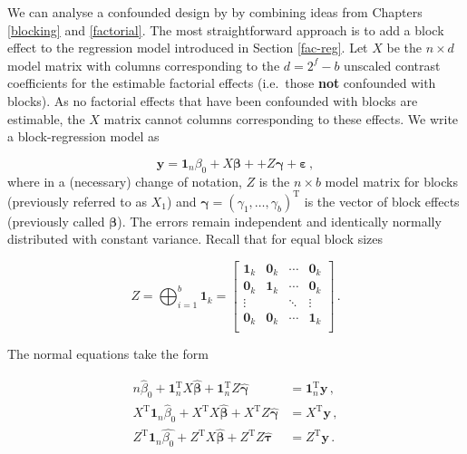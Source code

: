 \documentclass[
]{book}
\theoremstyle{definition}
\theoremstyle{definition}
\theoremstyle{definition}
\theoremstyle{definition}
\theoremstyle{remark}
\begin{document}
We can analyse a confounded design by by combining ideas from Chapters \ref{blocking} and \ref{factorial}. The most straightforward approach is to add a block effect to the regression model introduced in Section \ref{fac-reg}. Let \(X\) be the \(n\times d\) model matrix with columns corresponding to the \(d = 2^f - b\) unscaled contrast coefficients for the estimable factorial effects (i.e.~those \textbf{not} confounded with blocks). As no factorial effects that have been confounded with blocks are estimable, the \(X\) matrix cannot columns corresponding to these effects. We write a block-regression model as

\[
\boldsymbol{y}= \boldsymbol{1}_n\beta_0 + X\boldsymbol{\beta} + + Z\boldsymbol{\gamma} + \boldsymbol{\varepsilon}\,,
\]
where in a (necessary) change of notation, \(Z\) is the \(n \times b\) model matrix for blocks (previously referred to as \(X_1\)) and \(\boldsymbol{\gamma} = (\gamma_1,\ldots, \gamma_b)^{\mathrm{T}}\) is the vector of block effects (previously called \(\boldsymbol{\beta}\)). The errors remain independent and identically normally distributed with constant variance. Recall that for equal block sizes

\[
Z = \bigoplus_{i = 1}^b \boldsymbol{1}_{k} = \begin{bmatrix}
\boldsymbol{1}_{k} & \boldsymbol{0}_{k} & \cdots &  \boldsymbol{0}_{k} \\
\boldsymbol{0}_{k} & \boldsymbol{1}_{k} & \cdots &  \boldsymbol{0}_{k} \\
\vdots & & \ddots & \vdots \\
\boldsymbol{0}_{k} & \boldsymbol{0}_{k} & \cdots &  \boldsymbol{1}_{k} \\
\end{bmatrix}\,.
\]

The normal equations take the form

\begin{align}
n\hat{\beta}_0 + \boldsymbol{1}_n^{\mathrm{T}}X\hat{\boldsymbol{\beta}} + \boldsymbol{1}_n^{\mathrm{T}}Z\hat{\boldsymbol{\gamma}} & = \boldsymbol{1}_n^{\mathrm{T}}\boldsymbol{y}\,, \label{eq:fact-blocks-normal-1}\\
X^{\mathrm{T}}\boldsymbol{1}_n\hat{\beta}_0 + X^{\mathrm{T}}X\hat{\boldsymbol{\beta}} + X^{\mathrm{T}}Z\hat{\boldsymbol{\gamma}} & = X^{\mathrm{T}}\boldsymbol{y}\,, \label{eq:fact-blocks-normal-2}\\
Z^{\mathrm{T}}\boldsymbol{1}_n\hat{\beta_0} + Z^{\mathrm{T}}X\hat{\boldsymbol{\beta}} + Z^{\mathrm{T}}Z\hat{\boldsymbol{\tau}} & = Z^{\mathrm{T}}\boldsymbol{y}\,. \label{eq:fact-blocks-normal-3}\\
\end{align}
\end{document}
